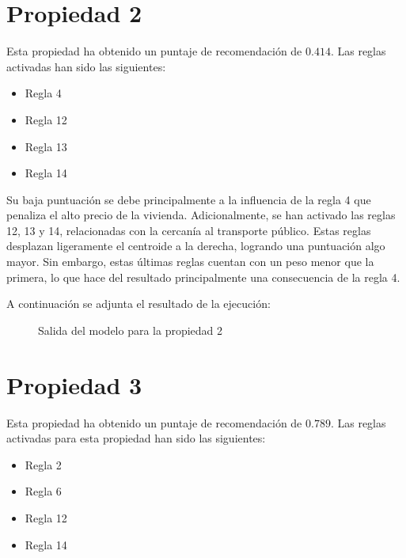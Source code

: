 \documentclass[12pt]{report} %
\begin{document}
    \section{Propiedad 2}
    
    Esta propiedad ha obtenido un puntaje de recomendación de $0.414$. Las reglas activadas han sido las siguientes: 
    \begin{itemize}
        \item Regla 4
        \item Regla 12
        \item Regla 13
        \item Regla 14
    \end{itemize}
    Su baja puntuación se debe principalmente a la influencia de la regla 4
    que penaliza el alto precio de la vivienda. Adicionalmente, se han activado
    las reglas 12, 13 y 14, relacionadas con la cercanía al transporte público.
    Estas reglas desplazan ligeramente el centroide a la derecha, logrando una
    puntuación algo mayor. Sin embargo, estas últimas reglas cuentan con un
    peso menor que la primera, lo que hace del resultado
    principalmente una consecuencia de la regla 4.

    A continuación se adjunta el resultado de la ejecución:
    \begin{figure}[H]
        \centering
        \caption{Salida del modelo para la propiedad 2}
    \end{figure}

    \section{Propiedad 3}
    Esta propiedad ha obtenido un puntaje de recomendación de $0.789$. Las reglas activadas para esta propiedad han sido las siguientes: 
    \begin{itemize}
        \item Regla 2
        \item Regla 6
        \item Regla 12
        \item Regla 14
    \end{itemize}
\end{document}
